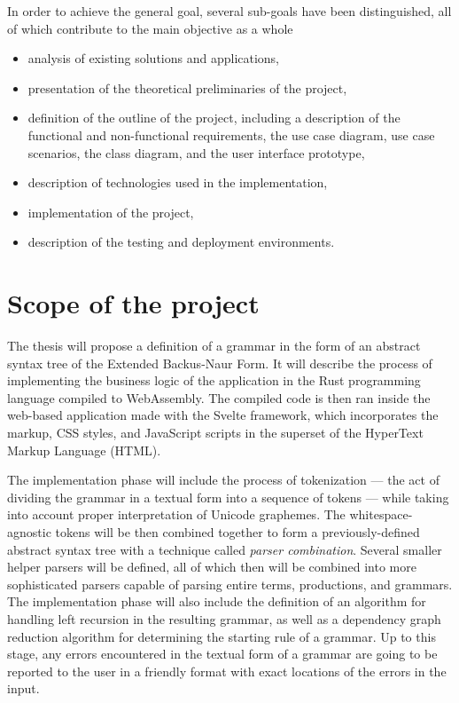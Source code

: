 \documentclass[english,engineering]{wizthesis}
\begin{document}
In order to achieve the general goal, several sub-goals have been
distinguished, all of which contribute to the main objective as a whole
\begin{itemize}
  \item analysis of existing solutions and applications,
  \item presentation of the theoretical preliminaries of the project,
  \item definition of the outline of the project, including a description of
  the functional and non-functional requirements, the use case diagram, use case
  scenarios, the class diagram, and the user interface prototype,
  \item description of technologies used in the implementation,
  \item implementation of the project,
  \item description of the testing and deployment environments.
\end{itemize}

\section{Scope of the project}

The thesis will propose a definition of a grammar in the form of an abstract
syntax tree of the Extended Backus-Naur Form. It will describe the process of
implementing the business logic of the application in the Rust programming
language compiled to WebAssembly. The compiled code is then ran inside the
web-based application made with the Svelte framework, which incorporates the
markup, CSS styles, and JavaScript scripts in the superset of the HyperText
Markup Language (HTML).

The implementation phase will include the process of tokenization --- the act of
dividing the grammar in a textual form into a sequence of tokens --- while
taking into account proper interpretation of Unicode graphemes. The
whitespace-agnostic tokens will be then combined together to form a
previously-defined abstract syntax tree with a technique called \emph{parser
combination}. Several smaller helper parsers will be defined, all of which then
will be combined into more sophisticated parsers capable of parsing entire
terms, productions, and grammars. The implementation phase will also include the
definition of an algorithm for handling left recursion in the resulting grammar,
as well as a dependency graph reduction algorithm for determining the starting
rule of a grammar. Up to this stage, any errors encountered in the textual form
of a grammar are going to be reported to the user in a friendly format with
exact locations of the errors in the input.
\end{document}
